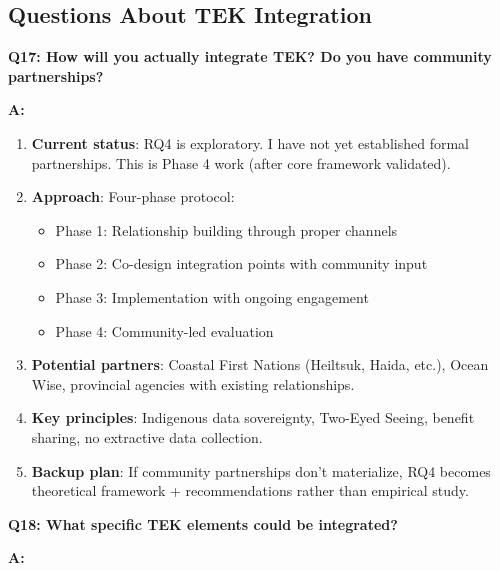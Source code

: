 \documentclass[11pt]{article}
\begin{document}
\subsection{Questions About TEK Integration}

\textbf{Q17: How will you actually integrate TEK? Do you have community partnerships?}

\textbf{A:}

\begin{enumerate}
    \item \textbf{Current status}: RQ4 is exploratory. I have not yet established formal partnerships. This is Phase 4 work (after core framework validated).

    \item \textbf{Approach}: Four-phase protocol:
    \begin{itemize}
        \item Phase 1: Relationship building through proper channels
        \item Phase 2: Co-design integration points with community input
        \item Phase 3: Implementation with ongoing engagement
        \item Phase 4: Community-led evaluation
    \end{itemize}

    \item \textbf{Potential partners}: Coastal First Nations (Heiltsuk, Haida, etc.), Ocean Wise, provincial agencies with existing relationships.

    \item \textbf{Key principles}: Indigenous data sovereignty, Two-Eyed Seeing, benefit sharing, no extractive data collection.

    \item \textbf{Backup plan}: If community partnerships don't materialize, RQ4 becomes theoretical framework + recommendations rather than empirical study.
\end{enumerate}

\textbf{Q18: What specific TEK elements could be integrated?}

\textbf{A:}
\end{document}
